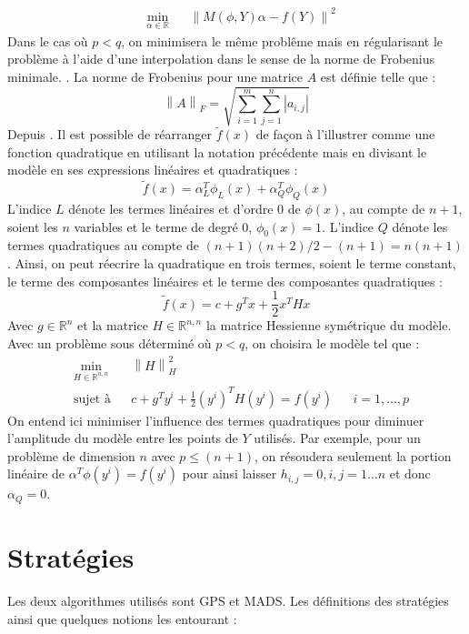 \documentclass[letterpaper]{scrartcl}
\newcommand{\R}{\mathbb{R}}
\newcommand{\norm}[1]{\left\lVert#1\right\rVert}
\begin{document}
\begin{equation*}
\begin{aligned}
& \underset{\alpha \in \R}{\text{min}}
& & \norm{M(\phi,Y)\alpha -f(Y)}^2
\end{aligned}
\end{equation*}
Dans le cas où $p<q$, on minimisera le même problême mais en régularisant le problème à l'aide d'une interpolation dans le sense de la norme de Frobenius minimale. \cite{MoWi2009} \cite{CuRoVi10}. La norme de Frobenius pour une matrice $A$ est définie telle que : 
\begin{equation*}
	\norm{A}_F = \sqrt{\overset{m}{\underset{i=1}{\sum}} \overset{n}{\underset{j=1}{\sum}}|a_{i,j}|}
\end{equation*}
Depuis \cite{GoVL1996}.
Il est possible de réarranger $\tilde{f}(x)$ de façon à l'illustrer comme une fonction quadratique en utilisant la notation précédente mais en divisant le modèle en ses expressions linéaires et quadratiques : 
\begin{equation*}
\tilde{f}(x) = \alpha_{L}^{T}\phi_L(x) + \alpha_{Q}^{T}\phi_Q(x)
\end{equation*}
L'indice $L$ dénote les termes linéaires et d'ordre 0 de $\phi(x)$, au compte de $n+1$, soient les $n$ variables et le terme de degré 0, $\phi_0(x)=1$. L'indice $Q$ dénote les termes quadratiques au compte de $(n+1)(n+2)/2 - (n+1) = n(n+1)$. Ainsi, on peut réecrire la quadratique en trois termes, soient le terme constant, le terme des composantes linéaires et le terme des composantes quadratiques : 
\begin{equation*}
\tilde{f}(x) = c + g^T x + \frac{1}{2} x^T H x
\end{equation*}
Avec $g \in \R^n$ et la matrice $H\in \R^{n,n}$ la matrice Hessienne symétrique du modèle. Avec un problème sous déterminé où $p<q$, on choisira le modèle tel que :
\begin{align*}
	&\underset{H \in \R^{n,n}}{\text{min}}& &\norm{H}^2_H & &\\
	&\text{sujet à} & &c + g^T y^i + \frac{1}{2} (y^i)^T H (y^i) = f(y^i) & &i = 1,\dots, p
\end{align*}
On entend ici minimiser l'influence des termes quadratiques pour diminuer l'amplitude du modèle entre les points de $Y$ utilisés. Par exemple, pour un problème de dimension $n$ avec $p\leq(n+1)$, on résoudera seulement la portion linéaire de $\alpha ^T \phi(y^i) = f(y^i)$ pour ainsi laisser $h_{i,j}=0, i,j=1\dots n$ et donc $\alpha_{Q}=0$.
\section{Stratégies}
Les deux algorithmes utilisés sont GPS et MADS. Les définitions des stratégies ainsi que quelques notions les entourant :
\end{document}
